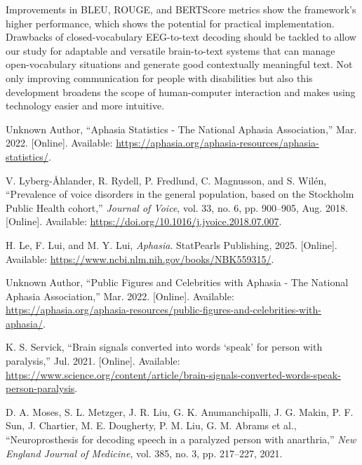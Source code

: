 \documentclass[journal]{IEEEtran}
\begin{document}
Improvements in BLEU, ROUGE, and BERTScore metrics show the framework's higher performance, which shows the potential for practical implementation. Drawbacks of closed-vocabulary EEG-to-text decoding should be tackled to allow our study for adaptable and versatile brain-to-text systems that can manage open-vocabulary situations and generate good contextually meaningful text. Not only improving communication for people with disabilities but also this development broadens the scope of human-computer interaction and makes using technology easier and more intuitive.

\ifCLASSOPTIONcaptionsoff
\newpage
\fi

\begin{thebibliography}{1}
	
	Unknown Author, ``Aphasia Statistics - The National Aphasia Association,'' Mar. 2022. [Online]. Available: \url{https://aphasia.org/aphasia-resources/aphasia-statistics/}.
	
	V. Lyberg-Åhlander, R. Rydell, P. Fredlund, C. Magnusson, and S. Wilén, ``Prevalence of voice disorders in the general population, based on the Stockholm Public Health cohort,'' \textit{Journal of Voice}, vol. 33, no. 6, pp. 900--905, Aug. 2018. [Online]. Available: \url{https://doi.org/10.1016/j.jvoice.2018.07.007}.
	
	H. Le, F. Lui, and M. Y. Lui, \textit{Aphasia}. StatPearls Publishing, 2025. [Online]. Available: \url{https://www.ncbi.nlm.nih.gov/books/NBK559315/}.
	
	Unknown Author, ``Public Figures and Celebrities with Aphasia - The National Aphasia Association,'' Mar. 2022. [Online]. Available: \url{https://aphasia.org/aphasia-resources/public-figures-and-celebrities-with-aphasia/}.
	
	K. S. Servick, ``Brain signals converted into words ‘speak' for person with paralysis,'' Jul. 2021. [Online]. Available: \url{https://www.science.org/content/article/brain-signals-converted-words-speak-person-paralysis}.
	
	D. A. Moses, S. L. Metzger, J. R. Liu, G. K. Anumanchipalli, J. G. Makin, P. F. Sun, J. Chartier, M. E. Dougherty, P. M. Liu, G. M. Abrams et al., ``Neuroprosthesis for decoding speech in a paralyzed person with anarthria,'' \textit{New England Journal of Medicine}, vol. 385, no. 3, pp. 217–227, 2021.
	

\end{thebibliography}
\end{document}
